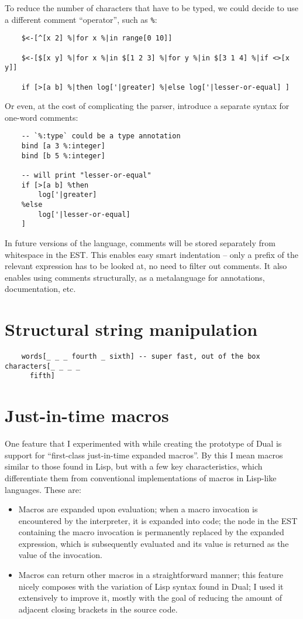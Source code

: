 To reduce the number of characters that have to be typed, we could decide to use
a different comment ``operator'', such as \texttt{\%}:
\begin{lstlisting}
    $<-[^[x 2] %|for x %|in range[0 10]]
    
    $<-[$[x y] %|for x %|in $[1 2 3] %|for y %|in $[3 1 4] %|if <>[x y]]

    if [>[a b] %|then log['|greater] %|else log['|lesser-or-equal] ]
\end{lstlisting}

Or even, at the cost of complicating the parser, introduce a separate syntax for
one-word comments:
\begin{lstlisting}
    -- `%:type` could be a type annotation
    bind [a 3 %:integer]
    bind [b 5 %:integer]

    -- will print "lesser-or-equal"
    if [>[a b] %then
        log['|greater]
    %else
        log['|lesser-or-equal]
    ]
\end{lstlisting}

In future versions of the language, comments will be stored separately from
whitespace in the EST. This enables easy smart indentation -- only a prefix of
the relevant expression has to be looked at, no need to filter out comments. It
also enables using comments structurally, as a metalanguage for annotations,
documentation, etc.

\section{Structural string manipulation}
\begin{lstlisting}
    words[_ _ _ fourth _ sixth] -- super fast, out of the box characters[_ _ _ _
      fifth]
\end{lstlisting}

\section{Just-in-time macros}
One feature that I experimented with while creating the prototype of Dual is
support for ``first-class just-in-time expanded macros''. By this I mean macros
similar to those found in Lisp, but with a few key characteristics, which
differentiate them from conventional implementations of macros in Lisp-like
languages. These are:
\begin{itemize}
	\item Macros are expanded upon evaluation; when a macro invocation is
          encountered by the interpreter, it is expanded into code; the node in
          the EST containing the macro invocation is permanently replaced by the
          expanded expression, which is subsequently evaluated and its value is
          returned as the value of the invocation.
	\item Macros can return other macros in a straightforward manner; this
          feature nicely composes with the variation of Lisp syntax found in
          Dual; I used it extensively to improve it, mostly with the goal of
          reducing the amount of adjacent closing brackets in the source code.
\end{itemize}

